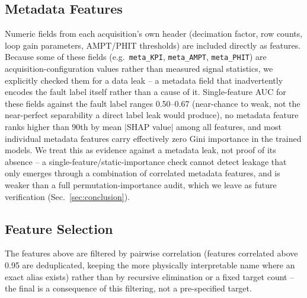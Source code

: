 \subsection{Metadata Features}

Numeric fields from each acquisition's own header (decimation factor, row counts, loop gain parameters, AMPT/PHIT thresholds) are included directly as features. Because some of these fields (e.g.\ \texttt{meta\_KPI}, \texttt{meta\_AMPT}, \texttt{meta\_PHIT}) are acquisition-configuration values rather than measured signal statistics, we explicitly checked them for a data leak -- a metadata field that inadvertently encodes the fault label itself rather than a cause of it. Single-feature AUC for these fields against the fault label ranges 0.50--0.67 (near-chance to weak, not the near-perfect separability a direct label leak would produce), no metadata feature ranks higher than 90th by mean $|$SHAP value$|$ among all \MetricZeroSixBinaryClassificationNFeatures{} features, and most individual metadata features carry effectively zero Gini importance in the trained models. We treat this as evidence against a metadata leak, not proof of its absence -- a single-feature/static-importance check cannot detect leakage that only emerges through a combination of correlated metadata features, and is weaker than a full permutation-importance audit, which we leave as future verification (Sec.~\ref{sec:conclusion}). %

\subsection{Feature Selection}

The features above are filtered by pairwise correlation (features correlated above 0.95 are deduplicated, keeping the more physically interpretable name where an exact alias exists) rather than by recursive elimination or a fixed target count -- the final \MetricZeroSixBinaryClassificationNFeatures{} is a consequence of this filtering, not a pre-specified target.  %
